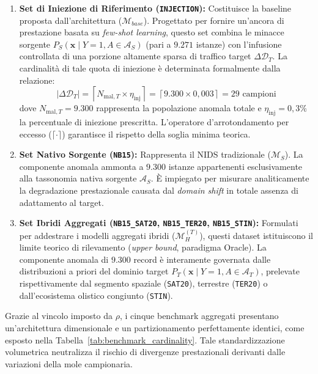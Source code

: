 \begin{enumerate}
    \item \textbf{Set di Iniezione di Riferimento (\texttt{INJECTION}):} Costituisce la baseline proposta dall'architettura ($\mathcal{M}_{base}$). Progettato per fornire un'ancora di prestazione basata su \textit{few-shot learning}, questo set combina le minacce sorgente $P_S(\mathbf{x} \mid Y = 1, A \in \mathcal{A}_S)$ (pari a $9.271$ istanze) con l'infusione controllata di una porzione altamente sparsa di traffico target $\Delta\mathcal{D}_T$. La cardinalità di tale quota di iniezione è determinata formalmente dalla relazione:
    \begin{equation}
        |\Delta\mathcal{D}_T| = \left\lceil N_{\text{mal}, T} \times \eta_{\text{inj}} \right\rceil = \left\lceil 9.300 \times 0{,}003 \right\rceil = 29 \text{ campioni}
        \label{eq:target_injection_size}
    \end{equation}
    dove $N_{\text{mal}, T} = 9.300$ rappresenta la popolazione anomala totale e $\eta_{\text{inj}} = 0{,}3\%$ la percentuale di iniezione prescritta. L'operatore d'arrotondamento per eccesso ($\lceil \cdot \rceil$) garantisce il rispetto della soglia minima teorica.
    \item \textbf{Set Nativo Sorgente (\texttt{NB15}):} Rappresenta il NIDS tradizionale ($\mathcal{M}_S$). La componente anomala ammonta a $9.300$ istanze appartenenti esclusivamente alla tassonomia nativa sorgente $\mathcal{A}_S$. È impiegato per misurare analiticamente la degradazione prestazionale causata dal \textit{domain shift} in totale assenza di adattamento al target.
    \item \textbf{Set Ibridi Aggregati (\texttt{NB15\_SAT20}, \texttt{NB15\_TER20}, \texttt{NB15\_STIN}):} Formulati per addestrare i modelli aggregati ibridi ($\mathcal{M}_H^{(T)}$), questi dataset istituiscono il limite teorico di rilevamento (\textit{upper bound}, paradigma Oracle). La componente anomala di $9.300$ record è interamente governata dalle distribuzioni a priori del dominio target $P_T(\mathbf{x} \mid Y = 1, A \in \mathcal{A}_T)$, prelevate rispettivamente dal segmento spaziale (\texttt{SAT20}), terrestre (\texttt{TER20}) o dall'ecosistema olistico congiunto (\texttt{STIN}).
\end{enumerate}

Grazie al vincolo imposto da $\rho$, i cinque benchmark aggregati presentano un'architettura dimensionale e un partizionamento perfettamente identici, come esposto nella Tabella~\ref{tab:benchmark_cardinality}. Tale standardizzazione volumetrica neutralizza il rischio di divergenze prestazionali derivanti dalle variazioni della mole campionaria.

